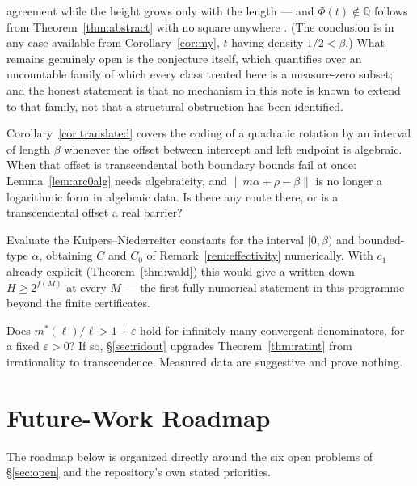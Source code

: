 \documentclass[11pt]{article}
\newcommand{\Q}{\mathbb{Q}}
\begin{document}
\begin{description}[leftmargin=3em,style=nextline]
agreement while the height grows only with the length --- and $\Phi(t)\notin\Q$ follows from
Theorem~\ref{thm:abstract} with no square anywhere \cite{Phase9bTM}. (The conclusion is in any case
available from Corollary~\ref{cor:my}, $t$ having density $1/2<\beta$.) What remains genuinely open
is the conjecture itself, which quantifies over an uncountable family of which every class treated
here is a measure-zero subset; and the honest statement is that no mechanism in this note is known to
extend to that family, not that a structural obstruction has been identified.
\item[Open 7 --- Beyond an algebraic offset.] Corollary~\ref{cor:translated} covers the coding of a
quadratic rotation by an interval of length $\beta$ whenever the offset between intercept and left
endpoint is algebraic. When that offset is transcendental both boundary bounds fail at once:
Lemma~\ref{lem:arc0alg} needs algebraicity, and $\lVert m\alpha+\rho-\beta\rVert$ is no longer a
logarithmic form in algebraic data. Is there any route there, or is a transcendental offset a real
barrier?
\item[Open 8 --- Explicit constants.] Evaluate the Kuipers--Niederreiter constants
\cite{KuipersNiederreiter} for the interval $[0,\beta)$ and bounded-type $\alpha$, obtaining $C$ and
$C_0$ of Remark~\ref{rem:effectivity} numerically. With $c_1$ already explicit
(Theorem~\ref{thm:wald}) this would give a written-down $H\ge2^{f(M)}$ at every $M$ --- the first
fully numerical statement in this programme beyond the finite certificates.
\item[Open 9 --- Transcendence.] Does $m^*(\ell)/\ell>1+\varepsilon$ hold for infinitely many
convergent denominators, for a fixed $\varepsilon>0$? If so, \S\ref{sec:ridout} upgrades
Theorem~\ref{thm:ratint} from irrationality to transcendence. Measured data are suggestive and prove
nothing.
\end{description}

\section{Future-Work Roadmap}
\label{sec:roadmap}

The roadmap below is organized directly around the six open problems of \S\ref{sec:open} and the repository's own stated priorities.
\end{document}
